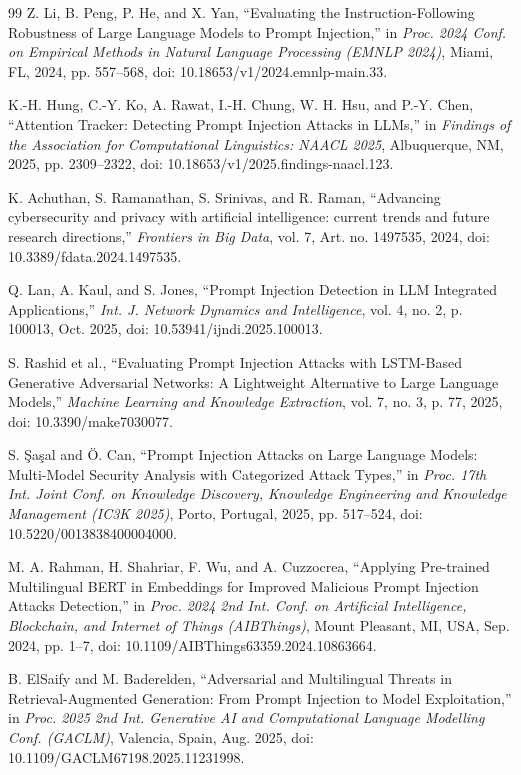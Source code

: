 \documentclass[12pt, letterpaper]{article}   %
\begin{document}
\begin{thebibliography}{99}
Z. Li, B. Peng, P. He, and X. Yan, ``Evaluating the Instruction-Following Robustness of Large Language Models to Prompt Injection,'' in \textit{Proc. 2024 Conf. on Empirical Methods in Natural Language Processing (EMNLP 2024)}, Miami, FL, 2024, pp. 557--568, doi: 10.18653/v1/2024.emnlp-main.33.

K.-H. Hung, C.-Y. Ko, A. Rawat, I.-H. Chung, W. H. Hsu, and P.-Y. Chen, ``Attention Tracker: Detecting Prompt Injection Attacks in LLMs,'' in \textit{Findings of the Association for Computational Linguistics: NAACL 2025}, Albuquerque, NM, 2025, pp. 2309--2322, doi: 10.18653/v1/2025.findings-naacl.123.

K. Achuthan, S. Ramanathan, S. Srinivas, and R. Raman, ``Advancing cybersecurity and privacy with artificial intelligence: current trends and future research directions,'' \textit{Frontiers in Big Data}, vol. 7, Art. no. 1497535, 2024, doi: 10.3389/fdata.2024.1497535.

Q. Lan, A. Kaul, and S. Jones, ``Prompt Injection Detection in LLM Integrated Applications,'' \textit{Int. J. Network Dynamics and Intelligence}, vol. 4, no. 2, p. 100013, Oct. 2025, doi: 10.53941/ijndi.2025.100013.

S. Rashid et al., ``Evaluating Prompt Injection Attacks with LSTM-Based Generative Adversarial Networks: A Lightweight Alternative to Large Language Models,'' \textit{Machine Learning and Knowledge Extraction}, vol. 7, no. 3, p. 77, 2025, doi: 10.3390/make7030077.

S. \c{S}a\c{s}al and \"{O}. Can, ``Prompt Injection Attacks on Large Language Models: Multi-Model Security Analysis with Categorized Attack Types,'' in \textit{Proc. 17th Int. Joint Conf. on Knowledge Discovery, Knowledge Engineering and Knowledge Management (IC3K 2025)}, Porto, Portugal, 2025, pp. 517--524, doi: 10.5220/0013838400004000.

M. A. Rahman, H. Shahriar, F. Wu, and A. Cuzzocrea, ``Applying Pre-trained Multilingual BERT in Embeddings for Improved Malicious Prompt Injection Attacks Detection,'' in \textit{Proc. 2024 2nd Int. Conf. on Artificial Intelligence, Blockchain, and Internet of Things (AIBThings)}, Mount Pleasant, MI, USA, Sep. 2024, pp. 1--7, doi: 10.1109/AIBThings63359.2024.10863664.

B. ElSaify and M. Baderelden, ``Adversarial and Multilingual Threats in Retrieval-Augmented Generation: From Prompt Injection to Model Exploitation,'' in \textit{Proc. 2025 2nd Int. Generative AI and Computational Language Modelling Conf. (GACLM)}, Valencia, Spain, Aug. 2025, doi: 10.1109/GACLM67198.2025.11231998.


\end{thebibliography}
\end{document}
